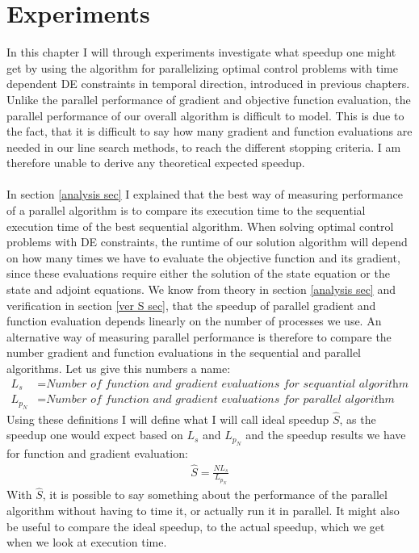 \chapter{Experiments}
In this chapter I will through experiments investigate what speedup one might get by using the algorithm for parallelizing optimal control problems with  time dependent DE constraints in temporal direction, introduced in previous chapters. Unlike the parallel performance of gradient and objective function evaluation, the parallel performance of our overall algorithm is difficult to model. This is due to the fact, that it is difficult to say how many gradient and function evaluations are needed in our line search methods, to reach the different stopping criteria. I am therefore unable to derive any theoretical expected speedup.
\\
\\
In section \ref{analysis sec} I explained that the best way of measuring performance of a parallel algorithm is to compare its execution time to the sequential execution time of the best sequential algorithm. When solving optimal control problems with DE constraints, the runtime of our solution algorithm will depend on how many times we have to evaluate the objective function and its gradient, since these evaluations require either the solution of the state equation or the state and adjoint equations. We know from theory in section \ref{analysis sec} and verification in section \ref{ver S sec}, that the speedup of parallel gradient and function evaluation depends linearly on the number of processes we use. An alternative way of measuring parallel performance is therefore to compare the number gradient and function evaluations in the sequential and parallel algorithms. Let us give this numbers a name:
\begin{align*}
L_s &= \textit{Number of function and gradient evaluations for sequantial algorithm}\\
L_{p_N} &= \textit{Number of function and gradient evaluations for parallel algorithm using N processes}
\end{align*} 
Using these definitions I will define what I will call ideal speedup $\hat{S}$, as the speedup one would expect based on $L_s$ and $L_{p_N}$ and the speedup results we have for function and gradient evaluation:
\begin{align}
\hat S = \frac{NL_s}{L_{p_N}} \label{ideal S}
\end{align}
With $\hat S$, it is possible to say something about the performance of the parallel algorithm without having to time it, or actually run it in parallel. It might also be useful to compare the ideal speedup, to the actual speedup, which we get when we look at execution time.
